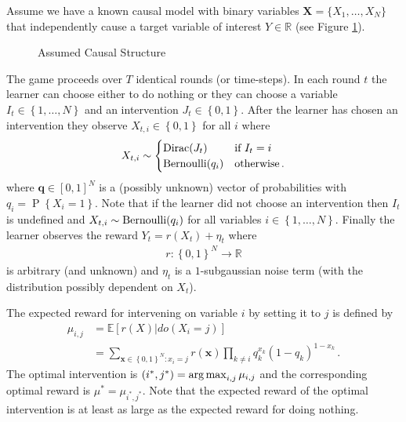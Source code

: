\documentclass{article}
\makeatletter
\newcommand{\tinytodo}[2][]{\todo[size=\tiny]{#2}}
\newcommand{\todom}[2][]{\tinytodo[color=green!20, #1]{M:\@#2}} %
\newcommand{\E}[1]{\mathbb E\left[#1\right]}
\newcommand{\R}{\mathbb R}
\newcommand{\set}[1]{\left\{#1\right\}}
\newcommand{\argmax}{\operatornamewithlimits{arg\,max}}
\newcommand{\eq}[1]{\begin{align*}#1\end{align*}}
\renewcommand{\P}[1]{\operatorname{P}\left\{#1\right\}}
\theoremstyle{plain}
\theoremstyle{definition}
\makeatother
\begin{document}
Assume we have a known causal model with binary variables $\boldsymbol{X} = \{X_{1},\ldots,X_{N}\}$ that independently cause a 
target variable of interest $Y \in \R$ (see Figure \ref{fig:causalStructure}).
\begin{figure}[h]
\centering
\caption{Assumed Causal Structure}
\label{fig:causalStructure}
\end{figure}


The game proceeds over $T$ identical rounds (or time-steps).
In each round $t$ the learner can choose either to do nothing or they can choose a variable $I_t \in \set{1,\ldots,N}$ and
an intervention $J_t \in \set{0,1}$. After the learner has chosen an intervention they observe $X_{t,i} \in \set{0,1}$ for all $i$ where
\eq{
X_{t,i} \sim \begin{cases}
\dirac(J_t) & \text{if } I_t = i \\
\bernoulli(q_i) & \text{otherwise}\,.
\end{cases}
}
where $\boldsymbol{q} \in [0,1]^N$ is a (possibly unknown) vector of probabilities with $q_i = \P{X_i = 1}$. Note that if the learner did not choose an intervention then $I_t$ is undefined
and $X_{t,i} \sim \operatorname{Bernoulli}(q_i)$ for all variables $i \in \set{1,\ldots,N}$.
Finally the learner observes the reward $Y_t = r(X_t) + \eta_t$ where 
\eq{
r : \set{0,1}^N \to \R
}
is arbitrary (and unknown) 
and $\eta_t$ is a $1$-subgaussian noise
term (with the distribution possibly dependent on $X_t$). 
\todom{Connect to opening ex.}

The expected reward for intervening on variable $i$ by setting it to $j$ is defined by
\eq{
\mu_{i,j} 
&= \E{r(X)|do(X_i = j)} \\
&= \sum_{\boldsymbol{x} \in \set{0,1}^N : x_i = j} r(\boldsymbol{x})  \prod_{k \neq i} q_k^{x_k} (1 - q_k)^{1-x_k} \,. 
}
The optimal intervention is $(i^*,j^*) = \argmax_{i,j} \mu_{i,j}$ and the corresponding optimal reward is $\mu^* = \mu_{i^*,j^*}$. 
Note that the expected reward of the optimal intervention is at least as large as the expected reward for doing nothing.
\end{document}

